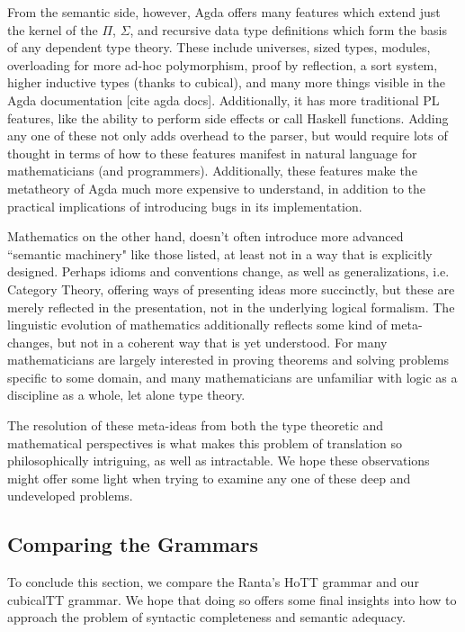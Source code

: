 From the semantic side, however, Agda offers many features which extend just the kernel
of the $\Pi$, $\Sigma$, and recursive data type definitions which form the basis
of any dependent type theory. These include universes, sized types, modules,
overloading for more ad-hoc polymorphism, proof by reflection, a sort system,
higher inductive types (thanks to cubical), and many more things visible in the Agda documentation [cite agda docs].
Additionally, it has more traditional PL features, like the ability to perform
side effects or call Haskell functions. Adding any one of these not only adds
overhead to the parser, but would require lots of thought in terms of how to
these features manifest in natural language for mathematicians (and programmers).
Additionally, these features make the metatheory of Agda much more expensive to
understand, in addition to the practical implications of introducing bugs in its
implementation.

Mathematics on the other hand, doesn't often introduce more advanced ``semantic
machinery" like those listed, at least not in a way that is explicitly designed.
Perhaps idioms and conventions change, as well as generalizations, i.e. Category
Theory, offering ways of presenting ideas more succinctly, but these are merely
reflected in the presentation, not in the underlying logical formalism. The
linguistic evolution of mathematics additionally reflects some kind of
meta-changes, but not in a coherent way that is yet understood. For many
mathematicians are largely interested in proving theorems and solving problems
specific to some domain, and many mathematicians are unfamiliar with logic as a
discipline as a whole, let alone type theory.

The resolution of these meta-ideas from both the type theoretic and mathematical
perspectives is what makes this problem of translation so philosophically
intriguing, as well as intractable. We hope these observations might offer some
light when trying to examine any one of these deep and undeveloped problems.

\subsection{Comparing the Grammars}

To conclude this section, we compare the Ranta's HoTT grammar and our cubicalTT
grammar. We hope that doing so offers some final insights into how to approach
the problem of syntactic
completeness and semantic adequacy. 

